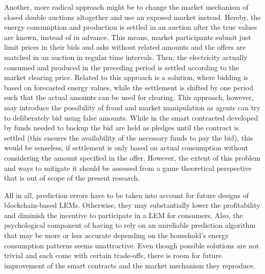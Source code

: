 Another, more radical approach might be to change the market mechanism of closed double auctions altogether and use an exposed market instead. Hereby, the energy consumption and production is settled in an auction after the true values are known, instead of in advance. This means, market participants submit just limit prices in their bids and asks without related amounts and the offers are matched in an auction in regular time intervals. Then, the electricity actually consumed and produced in the preceding period is settled according to the market clearing price. Related to this approach is a solution, where bidding is based on forecasted energy values, while the settlement is shifted by one period such that the actual amounts can be used for clearing. This approach, however, may introduce the possibility of fraud and market manipulation as agents can try to deliberately bid using false amounts. While in the smart contracted developed by \citet{Mengelkamp:2018a} funds needed to backup the bid are held as pledges until the contract is settled (this ensures the availability of the necessary funds to pay the bid), this would be senseless, if settlement is only based on actual consumption without considering the amount specified in the offer. However, the extent of this problem and ways to mitigate it should be assessed from a game theoretical perspective that is out of scope of the present research.

All in all, prediction errors have to be taken into account for future designs of blockchain-based LEMs. Otherwise, they may substantially lower the profitability and diminish the incentive to participate in a LEM for consumers. Also, the psychological component of having to rely on an unreliable prediction algorithm that may be more or less accurate depending on the household's energy consumption patterns seems unattractive. Even though possible solutions are not trivial and each come with certain trade-offs, there is room for future improvement of the smart contracts and the market mechanism they reproduce.

